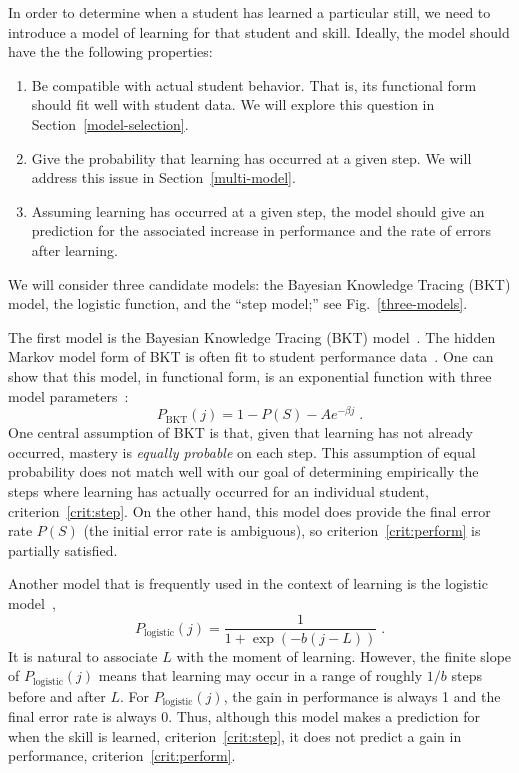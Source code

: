 \documentclass{acmlarge-edm}
\begin{document}
In order to determine when a student has learned a particular still,
we need to introduce a model of learning for that student and skill.
Ideally, the model should have the the following properties:
\label{model-criteria}
%
\begin{enumerate} 

\item Be compatible with actual student behavior.
      That is, its
      functional form should fit well with student data.
      We will explore this question in Section~\ref{model-selection}.  

\item \label{crit:step}
      Give the probability that learning has occurred at a given step.
      We will address this issue in Section~\ref{multi-model}.

\item  \label{crit:perform}
     Assuming learning has occurred at a given step, the model
     should give an prediction for the 
     associated increase in performance and 
     the rate of errors after learning.

\end{enumerate}
%
We will consider three candidate models:  
the Bayesian Knowledge Tracing (BKT) model, the logistic function,
and the ``step model;''
see Fig.~\ref{three-models}.


The first model is the Bayesian Knowledge Tracing (BKT) 
model~\cite{corbett_knowledge_1995}.  The hidden Markov model
form of BKT is often fit to student performance 
data~\cite{beck_identifiability:_2007}.  One can show that
this model, in functional form, is an exponential function
with three model parameters~\cite{van_de_sande_properties_2012}:
%
\begin{equation}
         P_\mathrm{BKT}(j) = 1-P(S) -A e^{-\beta j} \; .
\end{equation}
%
One central assumption of BKT is that, given that learning
has not already occurred, mastery is {\em equally probable} on each step.
This assumption of equal probability does not match well with 
our goal of determining empirically the steps where learning has 
actually occurred for an individual student, criterion~\ref{crit:step}.
On the other hand, this model does provide the final
error rate $P(S)$ (the initial error rate is ambiguous), 
so criterion~\ref{crit:perform} is partially satisfied. 

Another model that is frequently used in the context of learning is
the logistic model~\cite{cen_learning_2006,chi_instructional_2011},
%
\begin{equation}
    P_\mathrm{logistic}(j)= \frac{1}{1+\exp\left(-b (j-L)\right)} \; .
\end{equation}
%
It is natural to associate $L$ with the moment of learning.  However,
the finite slope of $P_\mathrm{logistic}(j)$ means that learning may
occur in a range of roughly $1/b$ steps before and after $L$.  For
$P_\mathrm{logistic}(j)$, the gain in performance is always 1 and the
final error rate is always 0.  Thus, although this model makes a
prediction for when the skill is learned, criterion~\ref{crit:step},
it does not predict a gain in performance,
criterion~\ref{crit:perform}.
\end{document}

